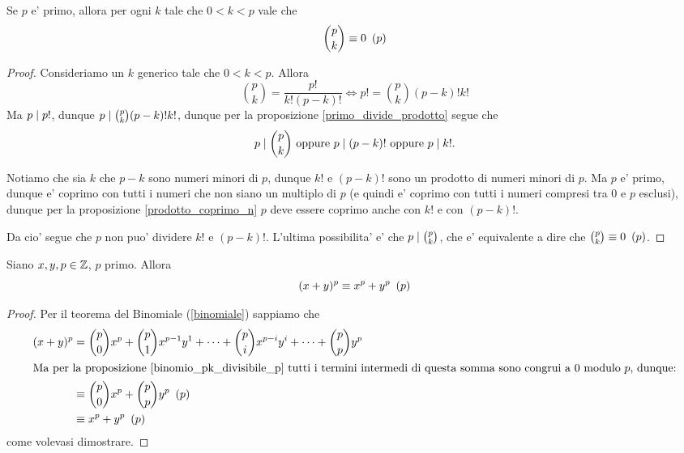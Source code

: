 \begin{proposition}\label{binomio_pk_divisibile_p}
    Se $p$ e' primo, allora per ogni $k$ tale che $0 < k < p$ vale che
    \begin{equation}
        \binom{p}{k} \equiv 0 \ \left(p\right)
    \end{equation}
\end{proposition}
\begin{proof}
    Consideriamo un $k$ generico tale che $0 < k < p$.
    Allora \[
        \binom{p}{k} = \frac{p!}{k!(p-k)!} \iff p! = \binom{p}{k}(p-k)!k!    
    \]
    Ma $p \mid p!$, dunque $p \mid \binom{p}{k}(p-k)!k!$, dunque per la proposizione \ref{primo_divide_prodotto} segue che \[
        p \mid \binom{p}{k} \text{ oppure } p \mid (p-k)! \text{ oppure } p \mid k!
    .\]

    Notiamo che sia $k$ che $p-k$ sono numeri minori di $p$, dunque $k!$ e $(p-k)!$ sono un prodotto di numeri minori di $p$. Ma $p$ e' primo, dunque e' coprimo con tutti i numeri che non siano un multiplo di $p$ (e quindi e' coprimo con tutti i numeri compresi tra $0$ e $p$ esclusi), dunque per la proposizione \ref{prodotto_coprimo_n} $p$ deve essere coprimo anche con $k!$ e con $(p-k)!$. 
    
    Da cio' segue che $p$ non puo' dividere $k!$ e $(p-k)!$.
    L'ultima possibilita' e' che $p \mid \binom{p}{k}$, che e' equivalente a dire che $\binom{p}{k} \equiv 0 \ \left(p\right)$.
\end{proof}

\begin{proposition}\label{(x+y)^p_congr_x^p+y^p}
    Siano $x, y, p \in \mathbb{Z}$, $p$ primo. Allora
    \begin{equation}
        (x+y)^p \equiv x^p + y^p \ \left(p\right)
    \end{equation}
\end{proposition}
\begin{proof}
    Per il teorema del Binomiale (\ref{binomiale}) sappiamo che
    \begin{alignat*}{1}
        (x+y)^p &= \binom{p}{0}x^p + \binom{p}{1}x^{p-1}y^1 + \dots + \binom{p}{i}x^{p-i}y^i + \dots + \binom{p}{p}y^p \\
        \intertext{Ma per la proposizione \ref{binomio_pk_divisibile_p} tutti i termini intermedi di questa somma sono congrui a $0$ modulo $p$, dunque:}
        &\equiv \binom{p}{0}x^p + \binom{p}{p}y^p \ \left(p\right)\\
        &\equiv x^p + y^p \ \left(p\right)
    \end{alignat*}
    come volevasi dimostrare.
\end{proof}

